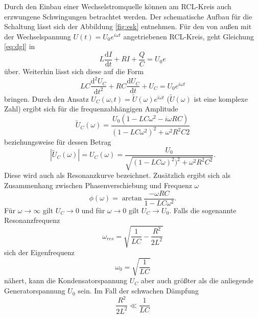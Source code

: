 Durch den Einbau einer Wechselstromquelle können am RCL-Kreis auch erzwungene Schwingungen 
betrachtet werden. Der schematische Aufbau für die Schaltung lässt sich der Abbildung \ref{fig:esk}
entnehmen. Für den von außen mit der Wechselspannung $U(t) = U_0 e^{i\omega t}$ angetriebenen 
RCL-Kreis, geht Gleichung \ref{eq:dgl} in 
\begin{equation}
    L \frac{\mathrm{d}I}{\mathrm{d}t} + RI + \frac{Q}{C} = U_0 e^{}
\end{equation}
\noindent über. Weiterhin lässt sich diese auf die Form
\begin{equation}
    LC \frac{\mathrm{d}^{2}U_C}{\mathrm{d}t^{2}} + RC \frac{\mathrm{d}U_C}{\mathrm{d}t} + U_C = U_0 e^{i\omega t}
\end{equation}
\noindent bringen. Durch den Ansatz $U_C(\omega,t) = \tilde{U}(\omega) e^{i\omega t}$ ($\tilde{U}(\omega)$ ist 
eine komplexe Zahl) ergibt sich 
für die frequenzabhängigen Amplitude 
\begin{equation}
    \tilde{U}_C(\omega) = \frac{U_0(1-LC\omega^{2}-i\omega RC)}{(1-LC \omega^{2})^{2} + \omega^{2}R^{2}C{2} }
\end{equation}
beziehungsweise für dessen Betrag
\begin{equation}
    |\tilde{U}_C(\omega)| = U_C(\omega)= \frac{U_0}{\sqrt{(1-LC\omega)^{2})^{2}+\omega^{2}R^{2}C^{2}}}.
\end{equation}
Diese wird auch als Resonanzkurve bezeichnet. Zusätzlich ergibt sich als Zusammenhang
zwischen Phasenverschiebung und Frequenz $\omega$
\begin{equation}
    \phi(\omega) = \arctan{\frac{-\omega RC}{1-LC \omega^{2}}}.
    \label{eq:ll}
\end{equation}
\noindent
Für $\omega \rightarrow \infty$ gilt
$U_C \rightarrow 0$ und für $\omega \rightarrow 0$ gilt $U_C \rightarrow U_0$. Falls die 
sogenannte Resonanzfrequenz 
\begin{equation}
    \omega_{res} = \sqrt{\frac{1}{LC} - \frac{R^{2}}{2L^{2}}}
    \label{eq:res}
\end{equation}
\noindent 
sich der Eigenfrequenz 
\begin{equation}
    \omega_0 = \sqrt{\frac{1}{LC}}
\end{equation}
nähert, kann die Kondensatorspannung $U_C$ aber auch größter als die anliegende Generatorspannung
$U_0$ sein. Im Fall der schwachen Dämpfung
\begin{equation*}
    \frac{R^{2}}{2L^{2}} \ll \frac{1}{LC}
\end{equation*}
